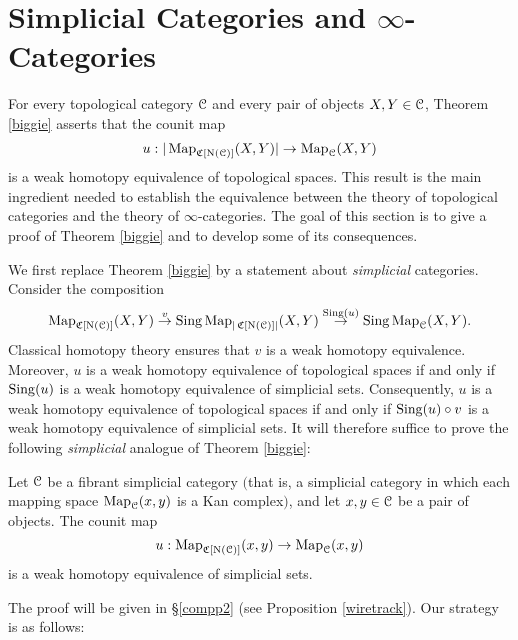 \section{Simplicial Categories and $\infty$-Categories}\label{valencequi}


\setcounter{theorem}{0}

For every topological category $\operatorname{\mathcal{C}}$ and every pair of objects $X,Y \in \operatorname{\mathcal{C}}$, Theorem \ref{biggie} asserts that the counit map
$$u: |\operatorname{{Map}}_{\operatorname{\mathfrak{C}}[\operatorname{N}(\operatorname{\mathcal{C}})] }(X,Y)| \rightarrow \operatorname{{Map}}_{\operatorname{\mathcal{C}}}(X,Y)$$
is a weak homotopy equivalence of topological spaces. This result is the main ingredient needed to establish the equivalence between the theory of topological categories and the theory of $\infty$-categories. The goal of this section is to give a proof of Theorem \ref{biggie} and to develop some of its consequences. 

We first replace Theorem \ref{biggie} by a statement about {\em simplicial} categories. Consider the composition
$$ \operatorname{{Map}}_{\operatorname{\mathfrak{C}}[ \operatorname{N}(\operatorname{\mathcal{C}}) ]}(X,Y) \stackrel{v}{\rightarrow}
\operatorname{Sing} \operatorname{{Map}}_{| \operatorname{\mathfrak{C}}[ \operatorname{N}(\operatorname{\mathcal{C}})] |}(X,Y) \stackrel{ \operatorname{Sing}(u)}{\rightarrow} \operatorname{Sing} \operatorname{{Map}}_{\operatorname{\mathcal{C}}}(X,Y).$$
Classical homotopy theory ensures that $v$ is a weak homotopy equivalence. Moreover, $u$ is a weak homotopy equivalence of topological spaces if and only if $\operatorname{Sing}(u)$ is a weak homotopy equivalence of simplicial sets. Consequently, $u$ is a weak homotopy equivalence of topological spaces if and only if $\operatorname{Sing}(u) \circ v$ is a weak homotopy equivalence of simplicial sets.
It will therefore suffice to prove the following {\em simplicial} analogue of Theorem \ref{biggie}:

\begin{theorem}\label{biggiesimp}
Let $\operatorname{\mathcal{C}}$ be a fibrant simplicial category $($that is, a simplicial category in which each mapping
space $\operatorname{{Map}}_{\operatorname{\mathcal{C}}}(x,y)$ is a Kan complex$)$, and let $x, y \in \operatorname{\mathcal{C}}$ be a pair of objects. The counit map
$$ u: \operatorname{{Map}}_{ \operatorname{\mathfrak{C}}[\operatorname{N}(\operatorname{\mathcal{C}})]}(x,y) \rightarrow \operatorname{{Map}}_{\operatorname{\mathcal{C}}}(x,y)$$ is a weak
homotopy equivalence of simplicial sets. 
\end{theorem}

The proof will be given in \S \ref{compp2} (see Proposition \ref{wiretrack}).
Our strategy is as follows:

